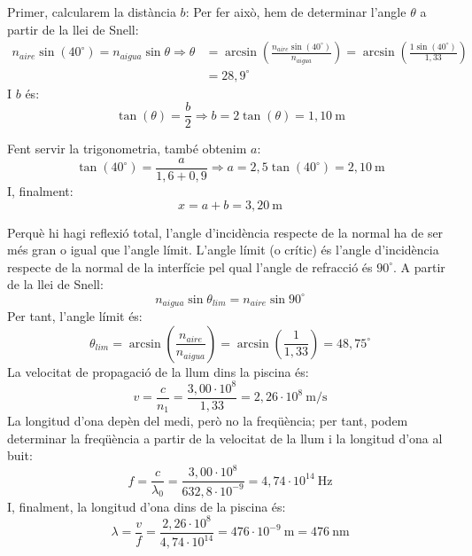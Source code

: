 \begin{solapartat}
 Primer, calcularem la distància $b$: Per fer això, hem de determinar l'angle $\theta$ a partir de la llei de Snell:
\begin{align*}
n_{aire}\sin(40^\circ) = n_{aigua}\sin\theta \Rightarrow \theta &= \arcsin\left(\frac{n_{aire}\sin(40^\circ)}{n_{aigua}}\right) = \arcsin\left(\frac{1\sin(40^\circ)}{1,33}\right)\\
&= 28,9^\circ
\end{align*}
 I $b$ és:
\[ \tan(\theta) = \frac{b}{2} \Rightarrow b = 2\tan(\theta) = 1,10\ \mathrm{m} \]

 Fent servir la trigonometria, també obtenim $a$:
\[ \tan(40^\circ) = \frac{a}{1,6 + 0,9} \Rightarrow a = 2,5\tan(40^\circ) = 2,10\ \mathrm{m} \]
 I, finalment:
\[ x = a + b = 3,20\ \mathrm{m} \]
\end{solapartat}

\begin{solapartat}
 Perquè hi hagi reflexió total, l'angle d'incidència respecte de la normal ha de ser més gran o igual que l'angle límit. L'angle límit (o crític) és l'angle d'incidència respecte de la normal de la interfície pel qual l'angle de refracció és $90^\circ$. A partir de la llei de Snell:
\[ n_{aigua}\sin\theta_{lim} = n_{aire}\sin 90^\circ \]
Per tant, l'angle límit és:
\[ \theta_{lim} = \arcsin\left(\frac{n_{aire}}{n_{aigua}}\right) = \arcsin\left(\frac{1}{1,33}\right) = 48,75^\circ \]
 La velocitat de propagació de la llum dins la piscina és:
\[ v = \frac{c}{n_1} = \frac{3,00\cdot 10^{8}}{1,33} = 2,26\cdot 10^{8}\ \mathrm{m/s} \]
 La longitud d'ona depèn del medi, però no la freqüència; per tant, podem determinar la freqüència a partir de la velocitat de la llum i la longitud d'ona al buit:
\[ f = \frac{c}{\lambda_0} = \frac{3,00\cdot 10^{8}}{632,8\cdot 10^{-9}} = 4,74\cdot 10^{14}\ \mathrm{Hz} \]
 I, finalment, la longitud d'ona dins de la piscina és:
\[ \lambda = \frac{v}{f} = \frac{2,26\cdot 10^{8}}{4,74\cdot 10^{14}} = 476\cdot 10^{-9}\ \mathrm{m} = 476\ \mathrm{nm} \]
\end{solapartat}
